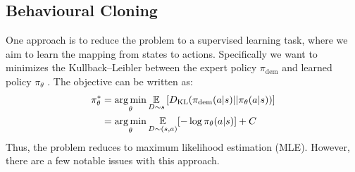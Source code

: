 \subsection{Behavioural Cloning}
One approach is to reduce the problem to a supervised learning task, where we aim to learn 
the mapping from states to actions. Specifically we want to minimizes the Kullback–Leibler between the expert policy  
 $\pi_\text{dem}$ and learned policy $\pi_\theta$ . The objective can be written as:
\begin{align*}
    \pi_\theta^* &= \operatorname*{arg\,min}\limits_\theta \underset{D\sim s}{\mathbb{E}}\left[D_{\text{KL}}(\pi_{\text{dem}}(a|s)|| \pi_\theta(a|s))\right] \\
    &= \operatorname*{arg\,min}\limits_\theta \underset{D\sim(s,a)}{\mathbb{E}}[-\log{\pi_\theta(a|s)}]+C
\end{align*}
Thus, the problem reduces to maximum likelihood estimation (MLE). However, there are a few notable issues with this approach.


